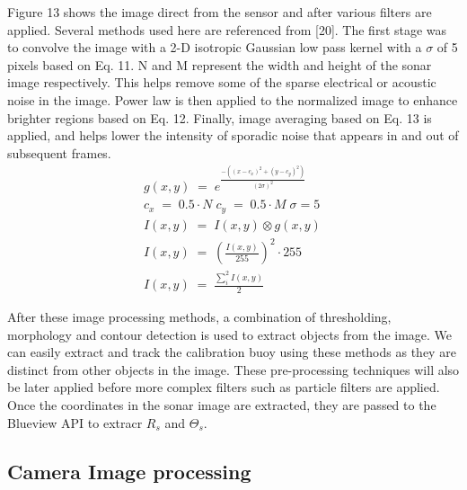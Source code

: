 \documentclass[a4paper]{IEEEtran}
\let\Theta\varTheta
\newcommand{\RSonar}{$\si{\textit{R}_{s}}$\xspace}
\newcommand{\ThetaSonar}{$\si{\Theta_{s}}$\xspace}
\begin{document}
Figure 13 shows the image direct from the sensor and after various filters are applied. Several methods used here are referenced from [20]. The first stage was to convolve the image with a 2-D isotropic Gaussian low pass kernel with a $\sigma $ of 5 pixels based on Eq. 11. N and M represent the width and height of the sonar image respectively. This helps remove some of the sparse electrical or acoustic noise in the image. Power law is then applied to the normalized image to enhance brighter regions based on Eq. 12. Finally, image averaging based on Eq. 13 is applied, and helps lower the intensity of sporadic noise that appears in and out of subsequent frames. 
\begingroup\makeatletter\def\f@size{7}\check@mathfonts
\begin{gather}
g\left( x,y \right)\; =\; e^{\frac{-\left( \left( x-c_{x} \right)^{2}+\left( y-c_{y} \right)^{2} \right)}{\left( 2\sigma  \right)^{2}}} \\
c_{x}\; =\; 0.5\cdot N\; c_{y}\; =\; 0.5\cdot M\; \sigma =5\; \nonumber\\
I\left( x,y \right)\; =\; I\left( x,y \right)\otimes g\left( x,y \right) \nonumber\\
I\left( x,y \right)\; =\; \left( \frac{I\left( x,y \right)}{255} \right)^{2}\cdot 255 \\
I\left( x,y \right)\; =\; \frac{\sum_{i}^{2}{I\left( x,y \right)}}{2}
\end{gather}
\endgroup

After these image processing methods, a combination of thresholding, morphology and contour detection is used to extract objects from the image. We can easily extract and track the calibration buoy using these methods as they are distinct from other objects in the image. These  pre-processing techniques will also be later applied before more complex filters such as particle filters are applied. Once the coordinates in the sonar image are extracted, they are passed to the Blueview API to extracr \RSonar and \ThetaSonar.

\subsection{Camera Image processing}
\end{document}
